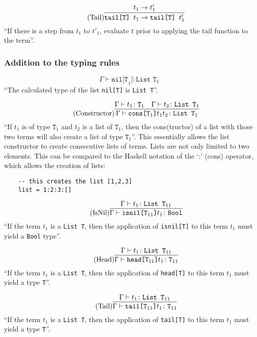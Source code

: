 \begin{equation*}
    \tag{Tail}
    \infer{
        \texttt{tail[T] } t_1 \rightarrow \texttt{tail[T] } t'_1
    }{
        t_1 \rightarrow t'_1
    }
\end{equation*}
``If there is a step from $t_1$ to $t'_1$, evaluate $t$ prior to applying
the tail function to the term''.

\subsubsection{Addition to the typing rules \cite{pierce2002ProgLang}}
\begin{equation*}
    \tag{Nil}
    \Gamma \vdash \texttt{nil[T}_1\texttt{]} \colon \texttt{List T}_1
\end{equation*}
``The calculated type of the list \texttt{nil[T]} is \texttt{List T}''.

\begin{equation*}
    \tag{Constructor}
    \infer{
    \Gamma \vdash \texttt{cons[T}_1 \texttt{]} t_1 t_2 \colon \texttt{List T}_1
    }{
    \Gamma \vdash t_1 \colon \texttt{T}_1 & \Gamma \vdash t_2 \colon \texttt{List T}_1
    }
\end{equation*}
``If $t_1$ is of type $\texttt{T}_1$ and $t_2$ is a list of $\texttt{T}_1$,
then the cons(tructor) of a list with those two terms will also create
a list of type $\texttt{T}_1$''. This essentially allows the list constructor
to create consecutive lists of terms. Lists are not only limited to two elements.
This can be compared to the Haskell notation of the `:' (cons) operator, which
allows the creation of lists:

\begin{verbatim}
    -- this creates the list [1,2,3]
    list = 1:2:3:[]
\end{verbatim}

\begin{equation*}
    \tag{IsNil}
    \infer{
    \Gamma \vdash \texttt{isnil[T}_{11} \texttt{]} t_1 \colon \texttt{Bool}
    }{
    \Gamma \vdash t_1 \colon \texttt{List T}_{11}
    }
\end{equation*}
``If the term $t_1$ is a \texttt{List T}, then the application of
\texttt{isnil[T]} to this term $t_1$ must yield a \texttt{Bool} type''.

\begin{equation*}
    \tag{Head}
    \infer{
    \Gamma \vdash \texttt{head[T}_{11} \texttt{]} t_1 \colon \texttt{T}_{11}
    }{
    \Gamma \vdash t_1 \colon \texttt{List T}_{11}
    }
\end{equation*}
``If the term $t_1$ is a \texttt{List T}, then the application of
\texttt{head[T]} to this term $t_1$ must yield a type \texttt{T}''.

\begin{equation*}
    \tag{Tail}
    \infer{
    \Gamma \vdash \texttt{tail[T}_{11} \texttt{]} t_1 \colon \texttt{T}_{11}
    }{
    \Gamma \vdash t_1 \colon \texttt{List T}_{11}
    }
\end{equation*}
``If the term $t_1$ is a \texttt{List T}, then the application of
\texttt{tail[T]} to this term $t_1$ must yield a type \texttt{T}''.
